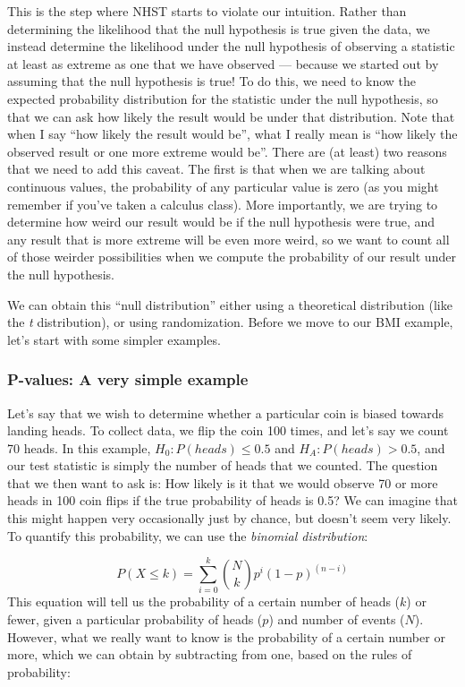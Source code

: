 \documentclass[12pt,]{book}
\theoremstyle{definition}
\theoremstyle{definition}
\theoremstyle{definition}
\theoremstyle{remark}
\begin{document}
This is the step where NHST starts to violate our intuition. Rather than determining the likelihood that the null hypothesis is true given the data, we instead determine the likelihood under the null hypothesis of observing a statistic at least as extreme as one that we have observed --- because we started out by assuming that the null hypothesis is true! To do this, we need to know the expected probability distribution for the statistic under the null hypothesis, so that we can ask how likely the result would be under that distribution. Note that when I say ``how likely the result would be'', what I really mean is ``how likely the observed result or one more extreme would be''. There are (at least) two reasons that we need to add this caveat. The first is that when we are talking about continuous values, the probability of any particular value is zero (as you might remember if you've taken a calculus class). More importantly, we are trying to determine how weird our result would be if the null hypothesis were true, and any result that is more extreme will be even more weird, so we want to count all of those weirder possibilities when we compute the probability of our result under the null hypothesis.

We can obtain this ``null distribution'' either using a theoretical distribution (like the \emph{t} distribution), or using randomization. Before we move to our BMI example, let's start with some simpler examples.

\hypertarget{pvalues-very-simple}{%
\subsubsection{P-values: A very simple example}\label{pvalues-very-simple}}

Let's say that we wish to determine whether a particular coin is biased towards landing heads. To collect data, we flip the coin 100 times, and let's say we count 70 heads. In this example, \(H_0: P(heads) \le 0.5\) and \(H_A: P(heads) > 0.5\), and our test statistic is simply the number of heads that we counted. The question that we then want to ask is: How likely is it that we would observe 70 or more heads in 100 coin flips if the true probability of heads is 0.5? We can imagine that this might happen very occasionally just by chance, but doesn't seem very likely. To quantify this probability, we can use the \emph{binomial distribution}:

\[
P(X \le k) = \sum_{i=0}^k \binom{N}{k} p^i (1-p)^{(n-i)}
\]
This equation will tell us the probability of a certain number of heads (\(k\)) or fewer, given a particular probability of heads (\(p\)) and number of events (\(N\)). However, what we really want to know is the probability of a certain number or more, which we can obtain by subtracting from one, based on the rules of probability:
\end{document}
